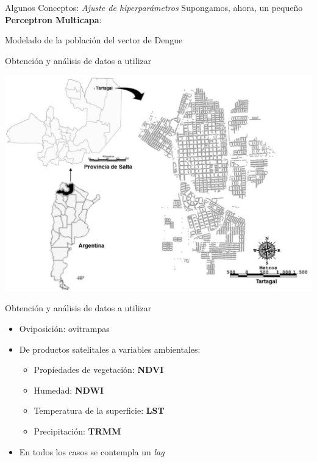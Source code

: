 \documentclass[10pt]{beamer}
\begin{document}
\begin{frame}{Algunos Conceptos: \textit{Ajuste de hiperparámetros}}
  Supongamos, ahora, un pequeño \textbf{Perceptron Multicapa}:
  \pause

  \mlp
\end{frame}



\begin{frame}{}
  \begin{center}
    Modelado de la población del vector de Dengue
  \end{center}
\end{frame}


\begin{frame}{Obtención y análisis de datos a utilizar}
  \begin{center}
    \includegraphics[width=.8\textwidth]{tartagal}
  \end{center}
\end{frame}


\begin{frame}{Obtención y análisis de datos a utilizar}
\begin{itemize}
  \item Oviposición: ovitrampas
  \item De productos satelitales a variables ambientales:
      \begin{itemize}
        \item Propiedades de vegetación: \textbf{NDVI}
        \item Humedad: \textbf{NDWI}
        \item Temperatura de la superficie: \textbf{LST}
        \item Precipitación: \textbf{TRMM}
      \end{itemize}
  \item En todos los casos se contempla un \textit{lag}
\end{itemize}
\end{frame}
\end{document}
